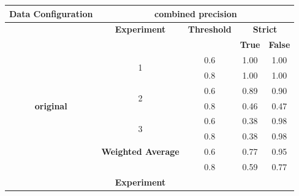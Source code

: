 \documentclass{mpaper}
\begin{document}
\begin{table}[]
\centering
\begin{tabular}{|c|cccc|}
\hline
\textbf{Data Configuration} & \multicolumn{4}{c|}{\textbf{combined precision}}                                                                                \\ \hline
\textbf{}                   & \multicolumn{1}{c|}{\textbf{Experiment}}       & \multicolumn{1}{c|}{\textbf{Threshold}} & \multicolumn{2}{c|}{\textbf{Strict}} \\ \cline{2-5} 
                            & \multicolumn{1}{l|}{}                          & \multicolumn{1}{c|}{}                   & \textbf{True}    & \textbf{False}    \\ \cline{2-5} 
                            & \multicolumn{1}{c|}{\multirow{2}{*}{1}}        & \multicolumn{1}{c|}{0.6}                & 1.00             & 1.00              \\
                            & \multicolumn{1}{c|}{}                          & \multicolumn{1}{c|}{0.8}                & 1.00             & 1.00              \\ \cline{2-5} 
                            & \multicolumn{1}{c|}{\multirow{2}{*}{2}}        & \multicolumn{1}{c|}{0.6}                & 0.89             & 0.90              \\
\textbf{original}           & \multicolumn{1}{c|}{}                          & \multicolumn{1}{c|}{0.8}                & 0.46             & 0.47              \\ \cline{2-5} 
                            & \multicolumn{1}{c|}{\multirow{2}{*}{3}}        & \multicolumn{1}{c|}{0.6}                & 0.38             & 0.98              \\
                            & \multicolumn{1}{c|}{}                          & \multicolumn{1}{c|}{0.8}                & 0.38             & 0.98              \\ \cline{2-5} 
                            & \multicolumn{1}{c|}{\textbf{Weighted Average}} & \multicolumn{1}{c|}{0.6}                & 0.77             & 0.95              \\
                            & \multicolumn{1}{c|}{}                          & \multicolumn{1}{c|}{0.8}                & 0.59             & 0.77              \\ \hline
                            & \multicolumn{1}{c|}{\textbf{Experiment}}       & \multicolumn{1}{c|}{}                   &                  &                   \\ \cline{2-5} 

\end{tabular}
\end{table}
\end{document}
